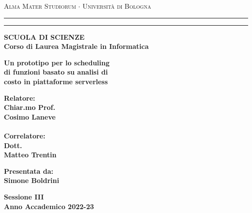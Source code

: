 \documentclass[../main.tex]{subfiles}
\begin{document}
\begin{titlepage}
\begin{center}
{{\Large{\textsc{Alma Mater Studiorum $\cdot$ Universit\`a di
Bologna}}}} \rule[0.1cm]{15.8cm}{0.1mm}
\rule[0.5cm]{15.8cm}{0.6mm}
{\small{\bf SCUOLA DI SCIENZE\\
Corso di Laurea Magistrale in Informatica}}
\end{center}
\vspace{15mm}
\begin{center}
{\LARGE{\bf Un prototipo per lo scheduling}}\\
\vspace{3mm}
{\LARGE{\bf di funzioni basato su analisi di }}\\
\vspace{3mm}
{\LARGE{\bf costo in piattaforme serverless}}\\
\end{center}
\vspace{40mm}
\par
\noindent
\begin{minipage}[t]{0.47\textwidth}
{\large{\bf Relatore:\\
Chiar.mo Prof.\\
Cosimo Laneve\\}}
{\large{\bf \\Correlatore:\\
Dott.\\ Matteo Trentin}
}
\end{minipage}
\hfill
\begin{minipage}[t]{0.47\textwidth}\raggedleft
{\large{\bf Presentata da:\\
Simone Boldrini}}
\end{minipage}
\vspace{20mm}
\begin{center}
{\large{\bf Sessione III\\%
Anno Accademico 2022-23}}%
\end{center}
\end{titlepage}
\end{document}
